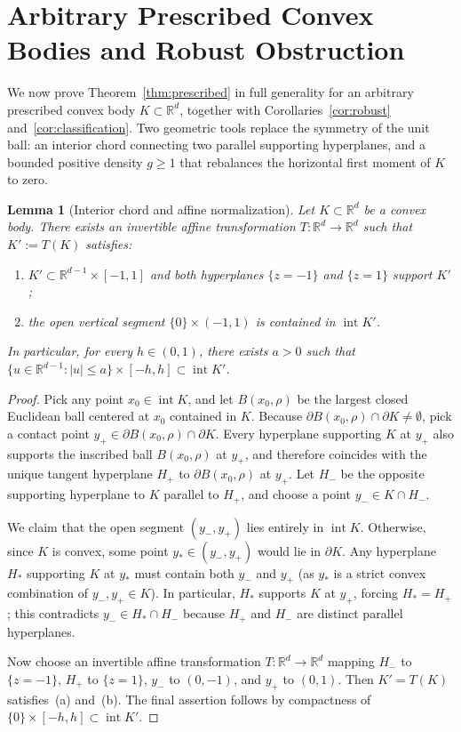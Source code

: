 \documentclass[11pt,a4paper]{amsart}
\numberwithin{equation}{section}
\newtheorem{lemma}[theorem]{Lemma}
\theoremstyle{definition}
\newcommand{\R}{\mathbb{R}}
\newcommand{\inte}{\operatorname{int}}
\begin{document}
\section{Arbitrary Prescribed Convex Bodies and Robust Obstruction}
\label{sec:general-body}

We now prove Theorem~\ref{thm:prescribed} in full generality for an arbitrary prescribed convex body $K \subset \R^d$, together with Corollaries~\ref{cor:robust} and~\ref{cor:classification}. Two geometric tools replace the symmetry of the unit ball: an interior chord connecting two parallel supporting hyperplanes, and a bounded positive density $g \ge 1$ that rebalances the horizontal first moment of $K$ to zero.

\begin{lemma}[Interior chord and affine normalization]
\label{lem:interior-chord}
Let $K \subset \R^d$ be a convex body. There exists an invertible affine transformation $T : \R^d \to \R^d$ such that $K' := T(K)$ satisfies:
\begin{enumerate}[label=\textup{(\alph*)}]
\item $K' \subset \R^{d-1} \times [-1, 1]$ and both hyperplanes $\{z = -1\}$ and $\{z = 1\}$ support $K'$;
\item the open vertical segment $\{0\} \times (-1, 1)$ is contained in $\inte K'$.
\end{enumerate}
In particular, for every $h \in (0,1)$, there exists $a > 0$ such that $\{u \in \R^{d-1} : |u| \le a\} \times [-h, h] \subset \inte K'$.
\end{lemma}

\begin{proof}
Pick any point $x_0 \in \inte K$, and let $B(x_0, \rho)$ be the largest closed Euclidean ball centered at $x_0$ contained in $K$. Because $\partial B(x_0, \rho) \cap \partial K \ne \emptyset$, pick a contact point $y_+ \in \partial B(x_0, \rho) \cap \partial K$. Every hyperplane supporting $K$ at $y_+$ also supports the inscribed ball $B(x_0, \rho)$ at $y_+$, and therefore coincides with the unique tangent hyperplane $H_+$ to $\partial B(x_0, \rho)$ at $y_+$. Let $H_-$ be the opposite supporting hyperplane to $K$ parallel to $H_+$, and choose a point $y_- \in K \cap H_-$.

We claim that the open segment $(y_-, y_+)$ lies entirely in $\inte K$. Otherwise, since $K$ is convex, some point $y_* \in (y_-, y_+)$ would lie in $\partial K$. Any hyperplane $H_*$ supporting $K$ at $y_*$ must contain both $y_-$ and $y_+$ (as $y_*$ is a strict convex combination of $y_-, y_+ \in K$). In particular, $H_*$ supports $K$ at $y_+$, forcing $H_* = H_+$; this contradicts $y_- \in H_* \cap H_-$ because $H_+$ and $H_-$ are distinct parallel hyperplanes.

Now choose an invertible affine transformation $T : \R^d \to \R^d$ mapping $H_-$ to $\{z = -1\}$, $H_+$ to $\{z = 1\}$, $y_-$ to $(0,-1)$, and $y_+$ to $(0,1)$. Then $K' = T(K)$ satisfies~(a) and~(b). The final assertion follows by compactness of $\{0\} \times [-h, h] \subset \inte K'$.
\end{proof}
\end{document}
